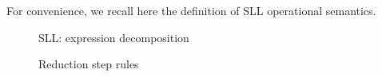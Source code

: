 For convenience, we recall here the definition of SLL operational semantics.

\begin{figure}[h!]

\caption{SLL: expression decomposition}
\label{fig:sll_decomposition}
\end{figure}

\begin{figure}[h!]

\caption{Reduction step rules}
\label{fig:sll_semantics}
\end{figure}